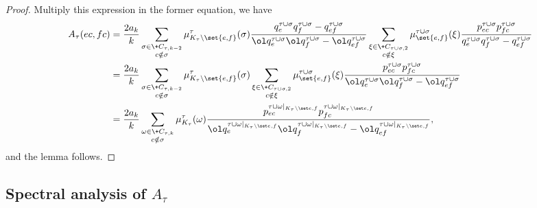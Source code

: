 \begin{proof}
    Multiply this expression in the former equation, we have
    \begin{align*}
        A_\tau(ec, fc)
        &=  \frac{2a_k}{k}
              \sum_{\substack{\sigma\in \+C_{\tau, k-2}\\ c\notin\sigma}}
              \mu^\tau_{K_\tau\setminus\set{e, f}}(\sigma)
              \frac{
              {q^{\tau\cup\sigma}_{e}q^{\tau\cup\sigma}_f - q^{\tau\cup\sigma}_{ef}}
              }{
              {\ol q^{\tau\cup\sigma}_{e}\ol q^{\tau\cup\sigma}_f - \ol q^{\tau\cup\sigma}_{ef}}
              }
              \sum_{\substack{\xi\in \+C_{\tau\cup\sigma, 2}\\ c\notin \xi}}
              \mu^{\tau\cup\sigma}_{\set{e, f}}(\xi)
                    \frac{p^{\tau\cup\sigma}_{ec}p^{\tau\cup\sigma}_{fc}}
                    {q^{\tau\cup\sigma}_{e}q^{\tau\cup\sigma}_f - q^{\tau\cup\sigma}_{ef}}
      \\&=  \frac{2a_k}{k}
              \sum_{\substack{\sigma\in \+C_{\tau, k-2}\\ c\notin\sigma}}
              \mu^\tau_{K_\tau\setminus\set{e, f}}(\sigma)
              \sum_{\substack{\xi\in \+C_{\tau\cup\sigma, 2}\\ c\notin \xi}}
              \mu^{\tau\cup\sigma}_{\set{e, f}}(\xi)
                    \frac{p^{\tau\cup\sigma}_{ec}p^{\tau\cup\sigma}_{fc}}
                         {\ol q^{\tau\cup\sigma}_{e}\ol q^{\tau\cup\sigma}_f - \ol q^{\tau\cup\sigma}_{ef}}
      \\&=  \frac{2a_k}{k}
              \sum_{\substack{\omega\in \+C_{\tau, k}\\ c\notin\sigma}}
              \mu^\tau_{K_\tau}(\omega)
                    \frac{p^{\taur}_{ec}p^{\taur}_{fc}}
                         {\ol q^{\taur}_{e}\ol q^{\taur}_f - \ol q^{\taur}_{ef}},
    \end{align*}
    and the lemma follows.
\end{proof}

\subsection{Spectral analysis of $A_\tau$}



